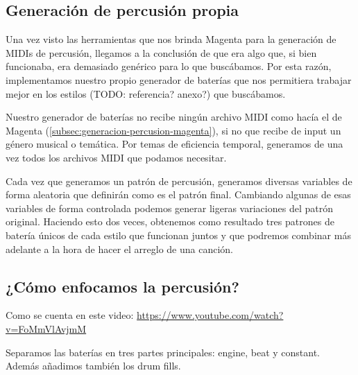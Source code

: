     \subsection{Generación de percusión propia}
    \label{subsec:generacion-percusion-propia}
    Una vez visto las herramientas que nos brinda Magenta para la generación de MIDIs de percusión, llegamos a la conclusión de que era algo que, si bien funcionaba, era demasiado genérico para lo que buscábamos. Por esta razón, implementamos nuestro propio generador de baterías que nos permitiera trabajar mejor en los estilos (TODO: referencia? anexo?) que buscábamos.

    Nuestro generador de baterías no recibe ningún archivo MIDI como hacía el de Magenta (\ref{subsec:generacion-percusion-magenta}), si no que recibe de input un género musical o temática. Por temas de eficiencia temporal, generamos de una vez todos los archivos MIDI que podamos necesitar. 
    
    Cada vez que generamos un patrón de percusión, generamos diversas variables de forma aleatoria que definirán como es el patrón final. Cambiando algunas de esas variables de forma controlada podemos generar ligeras variaciones del patrón original. Haciendo esto dos veces, obtenemos como resultado tres patrones de batería únicos de cada estilo que funcionan juntos y que podremos combinar más adelante a la hora de hacer el arreglo de una canción.

    \subsection{¿Cómo enfocamos la percusión?}

    Como se cuenta en este video: \url{https://www.youtube.com/watch?v=FoMmVlAvjmM}

    Separamos las baterías en tres partes principales: engine, beat y constant. Además añadimos también los drum fills.
    